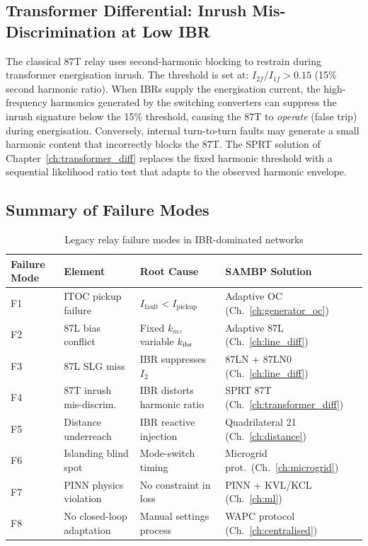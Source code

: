 \subsection{Transformer Differential: Inrush Mis-Discrimination at Low IBR}

The classical 87T relay uses second-harmonic blocking to restrain during
transformer energisation inrush. The threshold is set at:
$I_{2f}/I_{1f} > 0.15$ (15\% second harmonic ratio).
When IBRs supply the energisation current, the high-frequency harmonics
generated by the switching converters can suppress the inrush signature
below the 15\% threshold, causing the 87T to \emph{operate} (false trip)
during energisation. Conversely, internal turn-to-turn faults may generate
a small harmonic content that incorrectly blocks the 87T.
The SPRT solution of Chapter~\ref{ch:transformer_diff} replaces the fixed
harmonic threshold with a sequential likelihood ratio test that adapts to
the observed harmonic envelope.

\subsection{Summary of Failure Modes}

\begin{table}[htbp]
\caption{Legacy relay failure modes in IBR-dominated networks}
\label{tab:ch3_failures}
\small
\begin{tabularx}{\textwidth}{@{}lp{3cm}p{3.5cm}X@{}}
\toprule
Failure Mode & Element & Root Cause & SAMBP Solution \\
\midrule
F1 & ITOC pickup failure & $I_\mathrm{fault} < I_\mathrm{pickup}$ & Adaptive OC (Ch.~\ref{ch:generator_oc}) \\
F2 & 87L bias conflict & Fixed $k_m$, variable $k_\mathrm{ibr}$ & Adaptive 87L (Ch.~\ref{ch:line_diff}) \\
F3 & 87L SLG miss & IBR suppresses $I_2$ & 87LN + 87LN0 (Ch.~\ref{ch:line_diff}) \\
F4 & 87T inrush mis-discrim. & IBR distorts harmonic ratio & SPRT 87T (Ch.~\ref{ch:transformer_diff}) \\
F5 & Distance underreach & IBR reactive injection & Quadrilateral 21 (Ch.~\ref{ch:distance}) \\
F6 & Islanding blind spot & Mode-switch timing & Microgrid prot.\ (Ch.~\ref{ch:microgrid}) \\
F7 & PINN physics violation & No constraint in loss & PINN + KVL/KCL (Ch.~\ref{ch:ml}) \\
F8 & No closed-loop adaptation & Manual settings process & WAPC protocol (Ch.~\ref{ch:centralised}) \\
\bottomrule
\end{tabularx}
\end{table}
